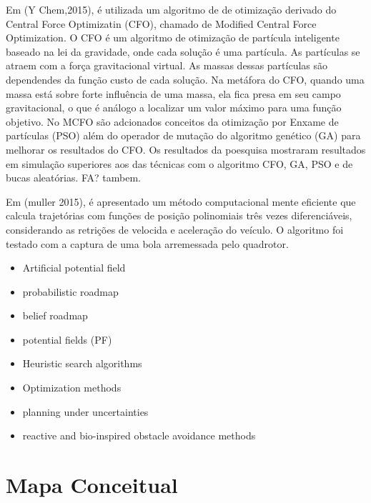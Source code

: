 Em (Y Chem,2015), é utilizada um algoritmo de de otimização derivado do Central Force Optimizatin (CFO), chamado de Modified Central Force Optimization. O CFO é um algoritmo de otimização de partícula inteligente baseado na lei da gravidade, onde cada solução é uma partícula. As partículas se atraem com a força gravitacional virtual. As massas dessas partículas são dependendes da função custo de cada solução. Na metáfora do CFO, quando uma massa está sobre forte influência de uma massa, ela fica presa em seu campo gravitacional, o que é análogo a localizar um valor máximo para uma função objetivo.
No MCFO são adcionados conceitos da otimização por Enxame de partículas (PSO) além do operador de mutação do algoritmo genético (GA) para melhorar os resultados do CFO. Os resultados da poesquisa mostraram resultados em simulação superiores aos das técnicas com o algoritmo CFO, GA, PSO e de bucas aleatórias. FA? tambem.

Em (muller 2015), é apresentado um método computacional mente eficiente que calcula trajetórias com funções de posição polinomiais três vezes diferenciáveis, considerando as retrições de velocida e aceleração do veículo. O algoritmo foi testado com a captura de uma bola arremessada pelo quadrotor.
 
\begin{itemize}
    \item Artificial potential field
    \item probabilistic roadmap
    \item belief roadmap
    \item potential fields (PF)
    \item Heuristic search algorithms
    \item Optimization methods
    \item planning under uncertainties
    \item reactive and bio-inspired obstacle avoidance methods
\end{itemize}



\section{Mapa Conceitual}

